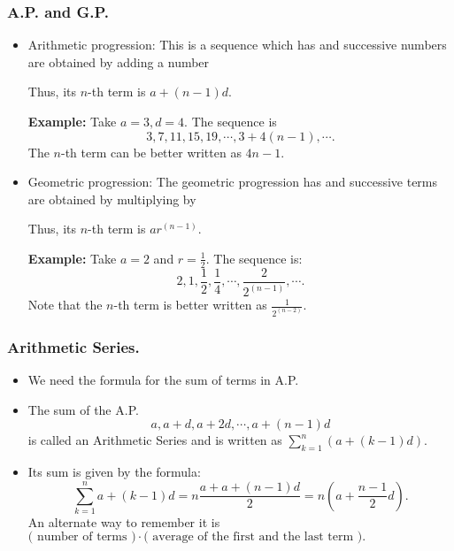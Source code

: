 %

\begin{frame}%
  \frametitle{A.P. and G.P.}
  \begin{itemize}%

\item {Arithmetic progression:} This is a sequence which has
 and successive numbers are obtained by adding a number

Thus, its $n$-th term is $a+(n-1)d$.

{\bf Example:} Take $a=3, d=4$. The sequence is
$$3,7,11,15,19,\cdots , 3+4(n-1),\cdots .$$
The $n$-th term can  be better written as $4n-1$.

\item {Geometric progression:} The geometric progression has
 and successive terms are obtained by multiplying by

Thus, its $n$-th term is $ar^{(n-1)}$.

{\bf Example:} Take $a=2$ and $r=\frac{1}{2}$.
The sequence is:
$$2, 1, \frac{1}{2}, \frac{1}{4},\cdots , \frac{2}{2^{(n-1)}}, \cdots .$$
Note that the $n$-th term is better written as $\frac{1}{2^{(n-2)}}$.


\end{itemize}
\end{frame}
%


\begin{frame}%
  \frametitle{Arithmetic Series.}
  \begin{itemize}%

\item We need the formula  for the sum of terms in A.P. 

\item The sum of the A.P. $$a,a+d, a+2d,\cdots , a+(n-1)d$$
is called an Arithmetic Series and is written as
$\displaystyle \sum_{k=1}^n (a+(k-1)d)$.

\item
Its sum is given by the formula:
$$\sum_{k=1}^n a+(k-1)d = n\frac{a+a+(n-1)d}{2}=n\left(a+\frac{n-1}{2}d\right).$$
An alternate way to remember it is
$\mbox{( number of terms )}\cdot \mbox{( average of the first and the last term )}.$

\end{itemize}
\end{frame}

%


